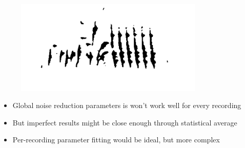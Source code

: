 \documentclass[t, xcolor={dvipsnames}]{beamer}
\begin{document}
%
%
%
%
%
%


\begin{frame}[fragile]
  \vspace{-0.5cm}
  \begin{figure}[!tfp]
    \centering
    \includegraphics[width=0.8\textwidth]{img/specgram-long-clean}
  \end{figure}

  \vspace{-1cm}

  \begin{addmargin}{0.5cm}
    \begin{itemize}
      \item Global noise reduction parameters is won't work well for every recording
      \item But imperfect results might be close enough through statistical average
      \item Per-recording parameter fitting would be ideal, but more complex
    \end{itemize}
  \end{addmargin}
\end{frame}
\end{document}
